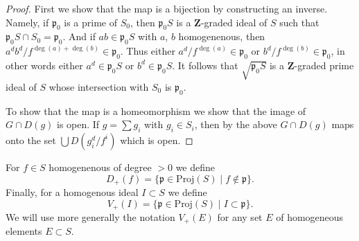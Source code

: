 \begin{proof}
First we show that the map is a bijection by constructing an inverse.
Namely, if $\mathfrak p_0$ is a prime of $S_0$, then $\mathfrak p_0S$
is a $\mathbf{Z}$-graded ideal of $S$ such that
$\mathfrak p_0S \cap S_0 = \mathfrak p_0$. And if $ab \in \mathfrak p_0S$
with $a$, $b$ homogenenous, then
$a^db^d/f^{\deg(a) + \deg(b)} \in \mathfrak p_0$.
Thus either $a^d/f^{\deg(a)} \in \mathfrak p_0$ or
$b^d/f^{\deg(b)} \in \mathfrak p_0$, in other words either
$a^d \in \mathfrak p_0S$ or $b^d \in \mathfrak p_0S$.
It follows that $\sqrt{\mathfrak p_0S}$ is a $\mathbf{Z}$-graded
prime ideal of $S$ whose intersection with $S_0$ is $\mathfrak p_0$.

\medskip\noindent
To show that the map is a homeomorphism we show that
the image of $G \cap D(g)$ is open. If $g = \sum g_i$
with $g_i \in S_i$, then by the above $G \cap D(g)$
maps onto the set $\bigcup D(g_i^d/f^i)$ which is open.
\end{proof}

\noindent
For $f \in S$ homogenenous of degree $> 0$ we define
$$
D_{+}(f) = \{ \mathfrak p \in \text{Proj}(S) \mid f \not\in \mathfrak p \}.
$$
Finally, for a homogenous ideal $I \subset S$ we define 
$$
V_{+}(I) = \{ \mathfrak p \in \text{Proj}(S) \mid I \subset \mathfrak p \}.
$$
We will use more generally the notation $V_{+}(E)$ for any
set $E$ of homogeneous elements $E \subset S$.

